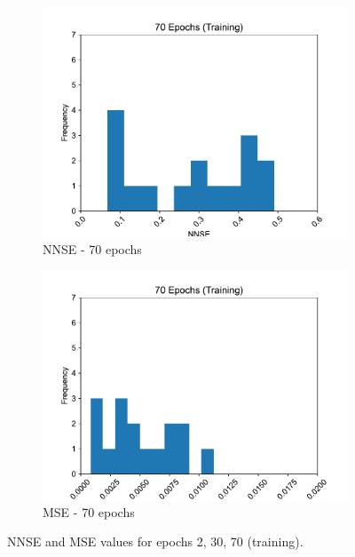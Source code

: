 \documentclass[11pt,twocolumn]{article}
\begin{document}
\begin{figure}[p]
\begin{subfigure}[b]{0.49\textwidth}
        \centering\includegraphics[width=1.0\linewidth]{images/70_training-NNSE.pdf}
        \caption{NNSE - 70 epochs}
        \label{fig:tbd3}
     \end{subfigure}
     \hfill
     \begin{subfigure}[b]{0.49\textwidth}
        \centering\includegraphics[width=1.0\linewidth]{images/70_training-MSE.pdf}
        \caption{MSE - 70 epochs}
        \label{fig:tbd4}
     \end{subfigure}
        \caption{NNSE and MSE values for epochs 2, 30, 70 (training).}
        \label{fig:six graphs}
\end{figure}
\end{document}
